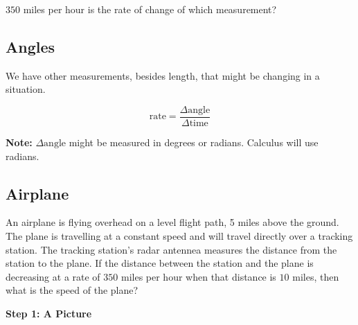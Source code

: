 \documentclass{ximera}
\begin{document}
\begin{question} 


$350$ miles per hour is the rate of change of which measurement?

\begin{multipleChoice}
\end{multipleChoice}

\end{question}



















\subsection*{Angles}



We have other measurements, besides length, that might be changing in a situation.




\[
\text{rate} = \frac{\Delta \text{angle}}{\Delta \text{time}} 
\]

\textbf{Note:} $\Delta \text{angle}$ might be measured in degrees or radians. Calculus will use radians.






\subsection*{Airplane}

An airplane is flying overhead on a level flight path, 5 miles above the ground.  The plane is travelling at a constant speed and will travel directly over a tracking station. The tracking station's radar antennea measures the distance from the station to the plane. If the distance between the station and the plane is decreasing at a rate of $350$ miles per hour when that distance is $10$ miles, then what is the speed of the plane?









\textbf{\textcolor{purple!85!blue}{Step 1: A Picture}}
\end{document}
